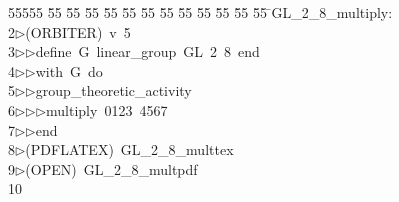 %
%
\begin{tabbing}
55555 \= 55 \= 55 \= 55 \= 55 \= 55 \= 55 \= 55 \= 55 \= 55 \= 55 \= 55 \= 55 \= \>GL\_2\_8\_multiply:\\[0pt]
2\>$\triangleright$\>(ORBITER)\ v\ 5\ \\[0pt]
3\>$\triangleright$\>$\triangleright$\>define\ G\ linear\_group\ GL\ 2\ 8\ end\ \\[0pt]
4\>$\triangleright$\>$\triangleright$\>with\ G\ do\ \\[0pt]
5\>$\triangleright$\>$\triangleright$\>group\_theoretic\_activity\ \\[0pt]
6\>$\triangleright$\>$\triangleright$\>$\triangleright$\>multiply\ 0123\ 4567\ \\[0pt]
7\>$\triangleright$\>$\triangleright$\>end\\[0pt]
8\>$\triangleright$\>(PDFLATEX)\ GL\_2\_8\_multtex\\[0pt]
9\>$\triangleright$\>(OPEN)\ GL\_2\_8\_multpdf\\[0pt]
10\>\end{tabbing}
